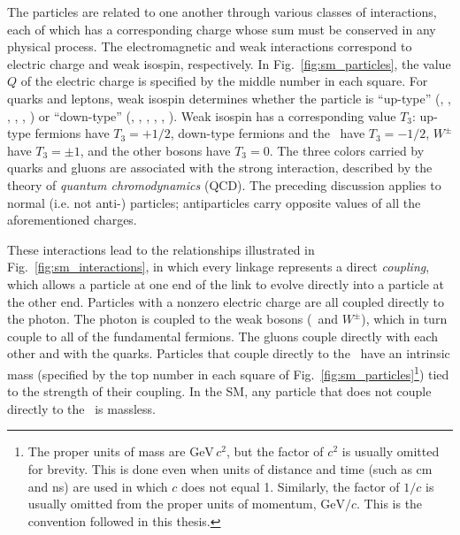 \documentclass[oneside, letterpaper, 12pt, oldfontcommands]{memoir}
\begin{document}
The particles are related to one another through various
classes of interactions, each of which has a corresponding charge whose sum must be conserved in any physical process.
The electromagnetic and weak interactions correspond to electric charge and weak isospin, respectively.
In Fig.~\ref{fig:sm_particles}, the value $Q$ of the electric charge is specified by the middle number in each square.
For quarks and leptons, weak isospin determines whether the particle is ``up-type''
(\Pu, \Pd, \Pt, \Pne, \Pnmu, \Pntau) or ``down-type'' (\Pd, \Ps, \Pb, \Pe, \Pmu, \Ptau).
Weak isospin has a corresponding value $T_{3}$: up-type fermions have $T_{3} = \mathrm{+}1/2$, down-type fermions and the \PH\ have
$T_{3} = \mathrm{-}1/2$, $W^\pm$ have $T_{3} = \pm1$, and the other bosons have $T_{3} = 0$.
The three colors carried by quarks and gluons are associated with the strong interaction, described by the theory of \textit{quantum
chromodynamics} (QCD). The preceding discussion applies to normal (i.e. not anti-) particles; antiparticles carry opposite values of all the
aforementioned charges.

These interactions lead to the relationships illustrated in Fig.~\ref{fig:sm_interactions}, in which every linkage represents
a direct \textit{coupling}, which allows a particle at one end of the link to evolve directly into a particle at the other end.
Particles with a nonzero electric charge are all coupled directly to the photon. The photon is coupled to the weak bosons
(\PZ\ and $W^\pm$), which in turn couple to all of the fundamental fermions.
The gluons couple directly with each other and with the quarks.
Particles that couple directly to the \PH\ have an intrinsic mass (specified by the top number in each square of Fig.~\ref{fig:sm_particles}\footnote{The
proper units of mass are $\mathrm{GeV}\,c^{2}$, but the factor of $c^{2}$ is usually omitted for brevity. This is done even when units of distance and
time (such as cm and ns) are used in which $c$ does not equal 1. Similarly, the factor of $1/c$ is usually omitted from the proper units of momentum,
$\mathrm{GeV}/c$. This is the convention followed in this thesis.}) tied to the strength of their coupling.
In the SM, any particle that does not couple directly to the \PH\ is massless.
\end{document}
